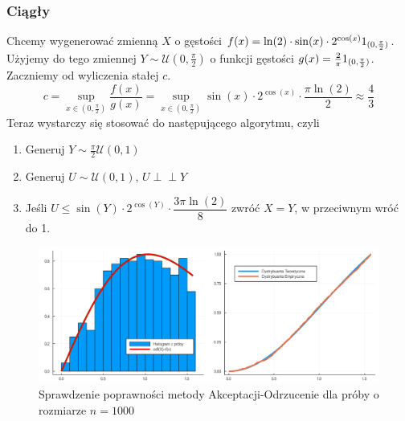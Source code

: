 \documentclass[12pt]{mwrep}
\newcommand{\indep}{\perp \!\!\! \perp}
\begin{document}
	
 
 	\subsubsection{Ciągły}
 	Chcemy wygenerować zmienną $X$ o gęstości $f(x)= \ln(2)\cdot\sin(x)\cdot2^{\cos(x)}\boldmath 1_{(0,\frac{\pi}{2})}$. Użyjemy do tego zmiennej $Y\sim\mathcal{U}(0,\frac{\pi}{2})$ o funkcji gęstości $g(x)=\frac{2}{\pi}\boldmath 1_{(0,\frac{\pi}{2})}$. Zaczniemy od wyliczenia stałej $c$.
 	\begin{equation}
 		c=\sup\limits_{x\in(0,\frac{\pi}{2})}\frac{f(x)}{g(x)}=\sup\limits_{x\in(0,\frac{\pi}{2})}\sin(x)\cdot2^{\cos(x)}\cdot\frac{\pi\ln(2)}{2}\approx \frac{4}{3}
 	\end{equation}
 	Teraz wystarczy się stosować do następującego algorytmu, czyli
	\begin{enumerate}[leftmargin=10mm]
		\item Generuj $Y\sim \frac{\pi}{2}\mathcal{U}(0,1)$
		\item Generuj $U\sim \mathcal{U}(0,1)$, $U\indep Y$
		\item Jeśli $U\leqslant\sin(Y)\cdot2^{\cos(Y)}\cdot\dfrac{3\pi\ln(2)}{8}$ zwróć $X=Y$, w przeciwnym wróć do 1.
	\end{enumerate}	
 	

	\begin{figure}[H]\caption{Sprawdzenie poprawności metody Akceptacji-Odrzucenie dla próby o rozmiarze $n=1000$}\label{fig:AO_con}
		\includegraphics[width=\columnwidth]{fig/fig_AO_con.png}
	\end{figure}
	
\end{document}
